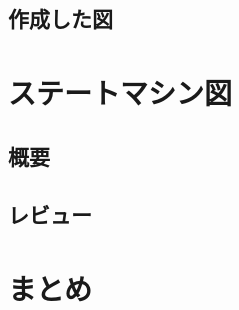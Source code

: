 \documentclass[documentclass]{jsarticle}
\begin{document}
\subsection*{作成した図}


\newpage

\section{ステートマシン図}
\subsection*{概要}


\subsection*{レビュー}


\section{まとめ}
\end{document}
